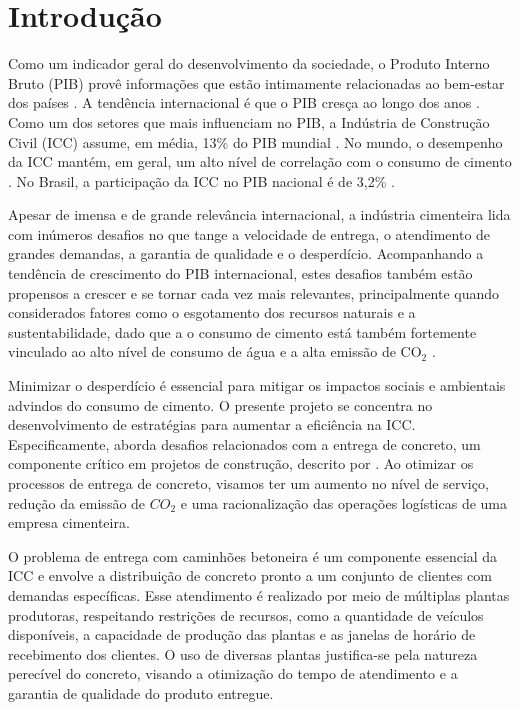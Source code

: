 \chapter{Introdução}
Como um indicador geral do desenvolvimento da sociedade, o Produto Interno Bruto (PIB)  provê informações que estão intimamente relacionadas ao bem-estar dos países \citep{gdpValidity}. A tendência internacional é que o PIB cresça ao longo dos anos \citep{oecd2024realgdp}. Como um dos setores que mais influenciam no PIB, a Indústria de Construção Civil (ICC) assume, em média, 13\% do PIB mundial \citep{mckinsey,fontereserva}.
No mundo, o desempenho da ICC mantém, em geral, um alto nível de correlação com o consumo de cimento \citep{globbulk}. No Brasil, a participação da ICC no PIB nacional é de 3,2\% \citep{SNIC2022}. 

Apesar de imensa e de grande relevância internacional, a indústria cimenteira lida com inúmeros desafios no que tange a velocidade de entrega, o atendimento de grandes demandas, a garantia de qualidade e o desperdício. Acompanhando a tendência de crescimento do PIB internacional, estes desafios também estão propensos a crescer e se tornar cada vez mais relevantes, principalmente quando considerados fatores como o esgotamento dos recursos naturais e a sustentabilidade, dado que a o consumo de cimento está também fortemente vinculado ao alto nível de consumo de água e a alta emissão de CO$_2$ \citep{Watts2019Concrete}.

Minimizar o desperdício é essencial para mitigar os impactos sociais e ambientais advindos do consumo de cimento. O presente projeto se concentra no desenvolvimento de estratégias para aumentar a eficiência na ICC. Especificamente, aborda desafios relacionados com a entrega de concreto, um componente crítico em projetos de construção, descrito por \cite{kinable}. Ao otimizar os processos de entrega de concreto, visamos ter um aumento no nível de serviço, redução da emissão de $CO_2$ e uma racionalização das operações logísticas de uma empresa cimenteira.

O problema de entrega com caminhões betoneira é um componente essencial da ICC e envolve a distribuição de concreto pronto a um conjunto de clientes com demandas específicas. Esse atendimento é realizado por meio de múltiplas plantas produtoras, respeitando restrições de recursos, como a quantidade de veículos disponíveis, a capacidade de produção das plantas e as janelas de horário de recebimento dos clientes. O uso de diversas plantas justifica-se pela natureza perecível do concreto, visando a otimização do tempo de atendimento e a garantia de qualidade do produto entregue.

